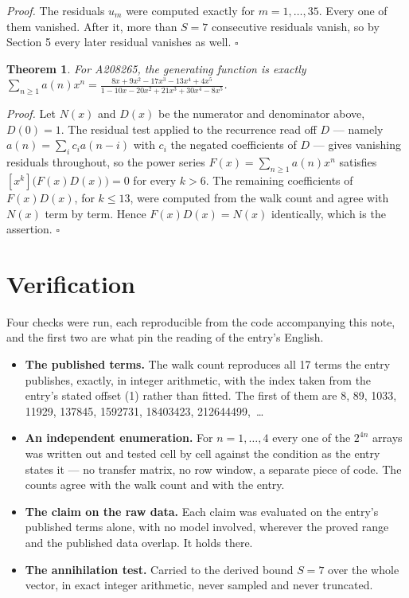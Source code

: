 \documentclass[11pt]{article}
\newtheorem{theorem}{Theorem}
\theoremstyle{definition}
\begin{document}
{\itshape Proof.} The residuals $u_m$ were computed exactly for $m = 1,\dots,35$. Every one of them vanished. After it, more than $S = 7$ consecutive residuals vanish, so by Section 5 every later residual vanishes as well. $\square$

\begin{theorem} For A208265, the generating function is exactly $\sum_{n\ge 1} a(n)x^n = \frac{8x + 9x^{2} - 17x^{3} - 13x^{4} + 4x^{5}}{1 - 10x - 20x^{2} + 21x^{3} + 30x^{4} - 8x^{5}}$.\end{theorem}

{\itshape Proof.} Let $N(x)$ and $D(x)$ be the numerator and denominator above, $D(0)=1$. The residual test applied to the recurrence read off $D$ --- namely $a(n) = \sum_i c_i a(n-i)$ with $c_i$ the negated coefficients of $D$ --- gives vanishing residuals throughout, so the power series $F(x)=\sum_{n\ge 1}a(n)x^n$ satisfies $[x^k]\bigl(F(x)D(x)\bigr) = 0$ for every $k > 6$. The remaining coefficients of $F(x)D(x)$, for $k \le 13$, were computed from the walk count and agree with $N(x)$ term by term. Hence $F(x)D(x) = N(x)$ identically, which is the assertion. $\square$

\section{Verification}

Four checks were run, each reproducible from the code accompanying this note, and the first two are what pin the reading of the entry's English.

\begin{itemize}

\item {\bfseries The published terms.} The walk count reproduces all 17 terms the entry publishes, exactly, in integer arithmetic, with the index taken from the entry's stated offset (1) rather than fitted. The first of them are 8, 89, 1033, 11929, 137845, 1592731, 18403423, 212644499,~\dots

\item {\bfseries An independent enumeration.} For $n = 1,\dots,4$ every one of the $2^{4n}$ arrays was written out and tested cell by cell against the condition as the entry states it --- no transfer matrix, no row window, a separate piece of code. The counts agree with the walk count and with the entry.

\item {\bfseries The claim on the raw data.} Each claim was evaluated on the entry's published terms alone, with no model involved, wherever the proved range and the published data overlap. It holds there.

\item {\bfseries The annihilation test.} Carried to the derived bound $S = 7$ over the whole vector, in exact integer arithmetic, never sampled and never truncated.

\end{itemize}
\end{document}
